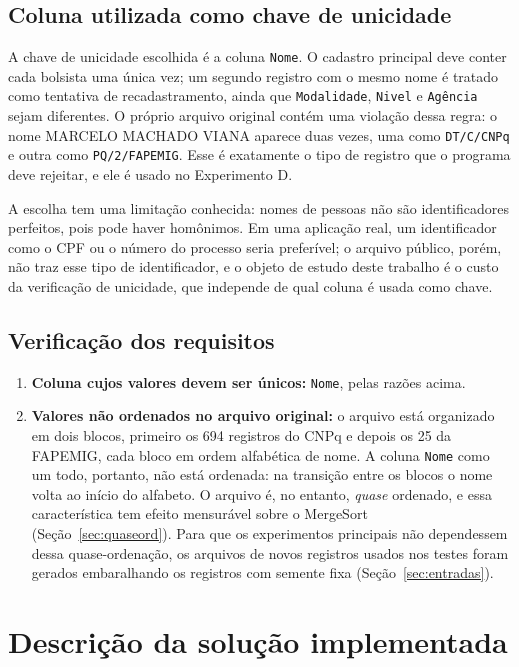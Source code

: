 \documentclass[11pt,a4paper]{article}
\begin{document}
\subsection{Coluna utilizada como chave de unicidade}

A chave de unicidade escolhida é a coluna \texttt{Nome}. O cadastro principal deve conter cada bolsista uma única vez; um segundo registro com o mesmo nome é tratado como tentativa de recadastramento, ainda que \texttt{Modalidade}, \texttt{Nivel} e \texttt{Agência} sejam diferentes. O próprio arquivo original contém uma violação dessa regra: o nome MARCELO MACHADO VIANA aparece duas vezes, uma como \texttt{DT/C/CNPq} e outra como \texttt{PQ/2/FAPEMIG}. Esse é exatamente o tipo de registro que o programa deve rejeitar, e ele é usado no Experimento D.

A escolha tem uma limitação conhecida: nomes de pessoas não são identificadores perfeitos, pois pode haver homônimos. Em uma aplicação real, um identificador como o CPF ou o número do processo seria preferível; o arquivo público, porém, não traz esse tipo de identificador, e o objeto de estudo deste trabalho é o custo da verificação de unicidade, que independe de qual coluna é usada como chave.

\subsection{Verificação dos requisitos}
\label{sec:requisitos}

\begin{enumerate}[itemsep=1pt]
  \item \textbf{Coluna cujos valores devem ser únicos:} \texttt{Nome}, pelas razões acima.
  \item \textbf{Valores não ordenados no arquivo original:} o arquivo está organizado em dois blocos, primeiro os 694 registros do CNPq e depois os 25 da FAPEMIG, cada bloco em ordem alfabética de nome. A coluna \texttt{Nome} como um todo, portanto, não está ordenada: na transição entre os blocos o nome volta ao início do alfabeto. O arquivo é, no entanto, \emph{quase} ordenado, e essa característica tem efeito mensurável sobre o MergeSort (Seção~\ref{sec:quaseord}). Para que os experimentos principais não dependessem dessa quase-ordenação, os arquivos de novos registros usados nos testes foram gerados embaralhando os registros com semente fixa (Seção~\ref{sec:entradas}).
\end{enumerate}

\section{Descrição da solução implementada}
\end{document}

